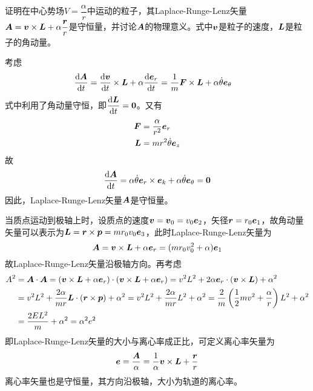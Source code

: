 \begin{question}
证明在中心势场$V=\dfrac{\alpha}{r}$中运动的粒子，其Laplace-Runge-Lenz矢量$\boldsymbol{A} = \boldsymbol{v} \times \boldsymbol{L} + \alpha \dfrac{\boldsymbol{r}}{r}$是守恒量，并讨论$\boldsymbol{A}$的物理意义。式中$\boldsymbol{v}$是粒子的速度，$\boldsymbol{L}$是粒子的角动量。
\end{question}
\begin{solution}
考虑
\begin{align*}
	\frac{\mathrm{d} \boldsymbol{A}}{\mathrm{d} t} & = \frac{\mathrm{d} \boldsymbol{v}}{\mathrm{d} t} \times \boldsymbol{L} + \alpha \frac{\mathrm{d} \boldsymbol{e}_r}{\mathrm{d} t} = \frac{1}{m} \boldsymbol{F} \times \boldsymbol{L} + \alpha \dot{\theta} \boldsymbol{e}_\theta
\end{align*}
式中利用了角动量守恒，即$\dfrac{\mathrm{d} \boldsymbol{L}}{\mathrm{d} t} = \boldsymbol{0}$。又有
\begin{align*}
	\boldsymbol{F} & = \frac{\alpha}{r^2} \boldsymbol{e}_r \\
	\boldsymbol{L} & = mr^2 \dot{\theta} \boldsymbol{e}_z
\end{align*}
故
\begin{equation*}
	\frac{\mathrm{d} \boldsymbol{A}}{\mathrm{d} t} = \alpha \dot{\theta} \boldsymbol{e}_r \times \boldsymbol{e}_k + \alpha \dot{\theta} \boldsymbol{e}_\theta = \boldsymbol{0}
\end{equation*}
因此，Laplace-Runge-Lenz矢量$\boldsymbol{A}$是守恒量。

当质点运动到极轴上时，设质点的速度$\boldsymbol{v} = \boldsymbol{v}_0 = v_0 \boldsymbol{e}_2$，矢径$\boldsymbol{r} = r_0 \boldsymbol{e}_1$，故角动量矢量可以表示为$\boldsymbol{L} = \boldsymbol{r} \times \boldsymbol{p} = mr_0 v_0 \boldsymbol{e}_3$，此时Laplace-Runge-Lenz矢量为
\begin{equation*}
	\boldsymbol{A} = \boldsymbol{v} \times \boldsymbol{L} + \alpha \boldsymbol{e}_r = (mr_0 v_0^2 +\alpha)\boldsymbol{e}_1
\end{equation*}
故Laplace-Runge-Lenz矢量沿极轴方向。再考虑
\begin{align*}
	A^2 & = \boldsymbol{A} \cdot \boldsymbol{A} = \left(\boldsymbol{v} \times \boldsymbol{L} + \alpha \boldsymbol{e}_r\right) \cdot \left(\boldsymbol{v} \times \boldsymbol{L} + \alpha \boldsymbol{e}_r\right) = v^2 L^2 + 2\alpha \boldsymbol{e}_r \cdot (\boldsymbol{v} \times \boldsymbol{L}) + \alpha^2 \\
	& = v^2 L^2 + \frac{2\alpha}{mr} \boldsymbol{L} \cdot (\boldsymbol{r} \times \boldsymbol{p}) + \alpha^2 = v^2 L^2 + \frac{2\alpha}{mr} L^2 + \alpha^2 = \frac{2}{m}\left(\frac12 mv^2 + \frac{\alpha}{r}\right) L^2 + \alpha^2 \\
	& = \frac{2EL^2}{m} + \alpha^2 = \alpha^2 e^2
\end{align*}
即Laplace-Runge-Lenz矢量的大小与离心率成正比，可定义{\heiti 离心率矢量}为
\begin{equation*}
	\boldsymbol{e} = \frac{\boldsymbol{A}}{\alpha} = \frac{1}{\alpha} \boldsymbol{v} \times \boldsymbol{L} + \frac{\boldsymbol{r}}{r}
\end{equation*}
离心率矢量也是守恒量，其方向沿极轴，大小为轨道的离心率。
\end{solution}

